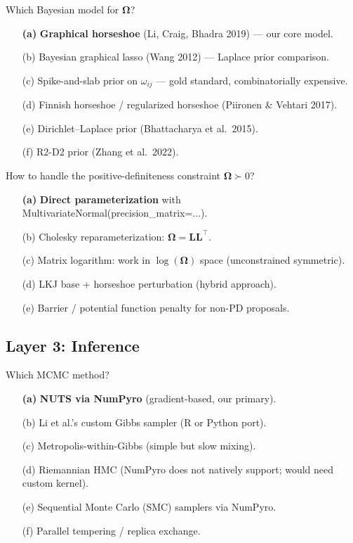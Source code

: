 \documentclass[11pt,a4paper]{article}
\newcommand{\bOmega}{\bm{\Omega}}
\begin{document}
\begin{decision}{Which Bayesian model for $\bOmega$?}
\begin{enumerate}[nosep]
  \item[\textbf{(a)}] \textbf{Graphical horseshoe} (Li, Craig, Bhadra 2019) --- our core model.
  \item[(b)] Bayesian graphical lasso (Wang 2012) --- Laplace prior comparison.
  \item[(c)] Spike-and-slab prior on $\omega_{ij}$ --- gold standard, combinatorially expensive.
  \item[(d)] Finnish horseshoe / regularized horseshoe (Piironen \& Vehtari 2017).
  \item[(e)] Dirichlet--Laplace prior (Bhattacharya et al.\ 2015).
  \item[(f)] R2-D2 prior (Zhang et al.\ 2022).
\end{enumerate}
\end{decision}

\begin{decision}{How to handle the positive-definiteness constraint $\bOmega \succ 0$?}
\begin{enumerate}[nosep]
  \item[\textbf{(a)}] \textbf{Direct parameterization} with MultivariateNormal(precision\_matrix=...).
  \item[(b)] Cholesky reparameterization: $\bOmega = \bm{L}\bm{L}^\top$.
  \item[(c)] Matrix logarithm: work in $\log(\bOmega)$ space (unconstrained symmetric).
  \item[(d)] LKJ base + horseshoe perturbation (hybrid approach).
  \item[(e)] Barrier / potential function penalty for non-PD proposals.
\end{enumerate}
\end{decision}

\subsection{Layer 3: Inference}

\begin{decision}{Which MCMC method?}
\begin{enumerate}[nosep]
  \item[\textbf{(a)}] \textbf{NUTS via NumPyro} (gradient-based, our primary).
  \item[(b)] Li et al.'s custom Gibbs sampler (R or Python port).
  \item[(c)] Metropolis-within-Gibbs (simple but slow mixing).
  \item[(d)] Riemannian HMC (NumPyro does not natively support; would need custom kernel).
  \item[(e)] Sequential Monte Carlo (SMC) samplers via NumPyro.
  \item[(f)] Parallel tempering / replica exchange.
\end{enumerate}
\end{decision}
\end{document}
